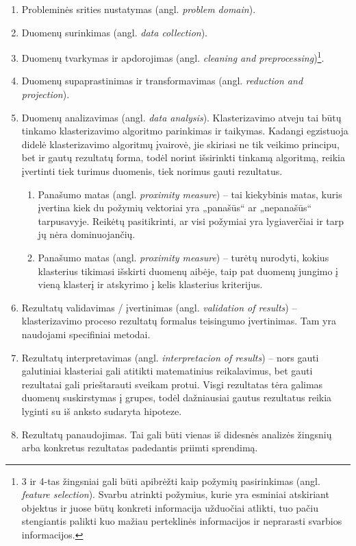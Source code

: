 \documentclass{VUMIFInfKursinis}
\newcommand{\ltang}[2]{#1 (angl. \textit{#2})}
\begin{document}
\begin{enumerate}
\item
  \ltang{Probleminės srities nustatymas}{problem domain}. 
\item
  \ltang{Duomenų surinkimas}{data collection}.
\item
  \ltang{Duomenų tvarkymas ir apdorojimas}{cleaning and
  preprocessing}\footnote{3 ir 4-tas žingsniai gali būti apibrėžti kaip
     \ltang{požymių pasirinkimas}{feature selection}. Svarbu
    atrinkti požymius, kurie yra esminiai atskiriant objektus ir juose
    būtų konkreti informacija užduočiai atlikti, tuo pačiu stengiantis
    palikti kuo mažiau perteklinės informacijos ir neprarasti svarbios
    informacijos.}.
\item
  \ltang{Duomenų supaprastinimas ir transformavimas}{reduction and
  projection}.
\item
  \ltang{Duomenų analizavimas}{data analysis}. Klasterizavimo
  atveju tai būtų tinkamo klasterizavimo algoritmo parinkimas ir
  taikymas. Kadangi egzistuoja didelė klasterizavimo algoritmų įvairovė,
  jie skiriasi ne tik veikimo principu, bet ir gautų rezultatų forma,
  todėl norint išsirinkti tinkamą algoritmą, reikia įvertinti tiek
  turimus duomenis, tiek norimus gauti rezultatus.

  \begin{enumerate}
  \item
    \ltang{Panašumo matas}{proximity measure} – tai kiekybinis
    matas, kuris įvertina kiek du požymių vektoriai yra „panašūs“ ar
    „nepanašūs“ tarpusavyje. Reikėtų pasitikrinti, ar visi požymiai yra
    lygiaverčiai ir tarp jų nėra dominuojančių.
  \item
	\ltang{Panašumo matas}{proximity measure}
	 – turėtų nurodyti, kokius klasterius tikimasi išskirti
    duomenų aibėje, taip pat duomenų jungimo į vieną klasterį ir
    atskyrimo į kelis klasterius kriterijus.
  \end{enumerate}
\item
  \ltang{Rezultatų validavimas / įvertinimas }{ validation of
  results} – klasterizavimo proceso rezultatų formalus teisingumo
  įvertinimas. Tam yra naudojami specifiniai metodai.
\item
  \ltang{Rezultatų interpretavimas}{ interpretacion of results} –
  nors gauti galutiniai klasteriai gali atitikti matematinius
  reikalavimus, bet gauti rezultatai gali prieštarauti sveikam protui.
  Visgi rezultatas tėra galimas duomenų suskirstymas į grupes, todėl
  dažniausiai gautus rezultatus reikia lyginti su iš anksto sudaryta
  hipoteze.
\item
  Rezultatų panaudojimas. Tai gali būti vienas iš didesnės analizės
  žingsnių arba konkretus rezultatas padedantis priimti sprendimą.
\end{enumerate}
\end{document}
